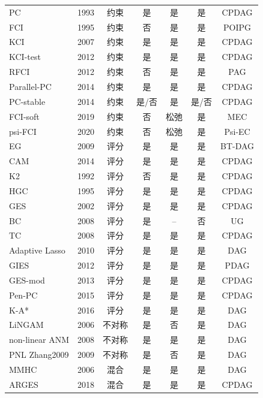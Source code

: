 \begin{longtable}{lc*{5}{c}}
	PC\cite{Spirtes2000} & 1993 & 约束 & 是 & 是 & 是 & CPDAG \\
	FCI\cite{Spirtes1995} & 1995 & 约束 & 否 & 是 & 是 & POIPG \\
	KCI\cite{Sun2007} & 2007 & 约束 & 是 & 是 & 是 & CPDAG \\
	KCI-test\cite{Zhang2012} & 2012 & 约束 & 是 & 是 & 是 & CPDAG \\
	RFCI\cite{Colombo2011} & 2012 & 约束 & 否 & 是 & 是 & PAG \\
	Parallel-PC\cite{Le2019} & 2014 & 约束 & 是 & 是 & 是 & CPDAG \\
	PC-stable\cite{Colombo2014} & 2014 & 约束 & 是/否 & 是 & 是/否 & CPDAG \\
	FCI-soft\cite{Kocaoglu2020} & 2019 & 约束 & 否 & 松弛 & 是 & MEC \\
	psi-FCI\cite{Jaber2020} & 2020 & 约束 & 否 & 松弛 & 是 & Psi-EC \\
	EG\cite{Elidan2008} & 2009 & 评分 & 是 & 是 & 是 & BT-DAG \\
	CAM \cite{Buehlmann2013} & 2014 & 评分 & 是 & 是 & 是 & CPDAG \\
	K2\cite{Cooper1992} & 1992 & 评分 & 否 & 是 & 是 & CPDAG \\
	HGC\cite{Heckerman1995} & 1995 & 评分 & 是 & 是 & 是 & CPDAG \\
	GES\cite{Chickering2003} & 2002 & 评分 & 是 & 是 & 是 & CPDAG \\
	BC\cite{ElGhaoui2008} & 2008 & 评分 & 是 & -- & 否 & UG \\
	TC\cite{Pellet2008} & 2008 & 评分 & 是 & 是 & 是 & CPDAG \\
	Adaptive Lasso\cite{Michailidis2010} & 2010 & 评分 & 是 & 是 & 是 & DAG \\
	GIES\cite{Hauser2012} & 2012 & 评分 & 是 & 是 & 是 & PDAG \\
	GES-mod\cite{AlonsoBarba2013} & 2013 & 评分 & 是 & 是 & 是 & CPDAG \\
	Pen-PC\cite{Ha2015} & 2015 & 评分 & 是 & 是 & 是 & CPDAG \\
	K-A*\cite{Scanagatta2016} & 2016 & 评分 & 是 & 是 & 是 & DAG \\
	LiNGAM\cite{Patrik2008} & 2006 & 不对称 & 是 & 否 & 是 & DAG \\
	non-linear ANM \cite{Janzing2012} & 2008 & 不对称 & 是 & 是 & 是 & DAG \\
	PNL {Zhang2009} & 2009 & 不对称 & 是 & 否 & 是 & DAG \\
	MMHC \cite{Tsamardinos2006} & 2006 & 混合 & 是 & 是 & 是 & DAG \\
	ARGES \cite{Nandy2016} & 2018 & 混合 & 是 & 是 & 是 & CPDAG \\
\end{longtable}

